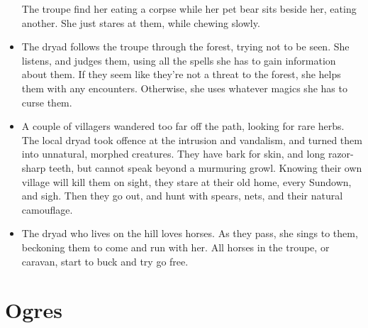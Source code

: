 \begin{multicols}{2}
\begin{itemize}
  The troupe find her eating a corpse while her pet bear sits beside her, eating another.
  She just stares at them, while chewing slowly.
  \item
  The dryad follows the troupe through the forest, trying not to be seen.
  She listens, and judges them, using all the spells she has to gain information about them.
  If they seem like they're not a threat to the forest, she helps them with any encounters.
  Otherwise, she uses whatever magics she has to curse them.
  \item
  A couple of villagers wandered too far off the path, looking for rare herbs.
  The local dryad took offence at the intrusion and vandalism, and turned them into unnatural, morphed creatures.
  They have bark for skin, and long razor-sharp teeth, but cannot speak beyond a murmuring growl.
  Knowing their own village will kill them on sight, they stare at their old home, every Sundown, and sigh.
  Then they go out, and hunt with spears, nets, and their natural camouflage.
  \item
  The dryad who lives on the hill loves horses.
  As they pass, she sings to them, beckoning them to come and run with her.
  All horses in the troupe, or caravan, start to buck and try go free.
\end{itemize}

\end{multicols}

\section[Ogre]{Ogres}
\label{ogre}

